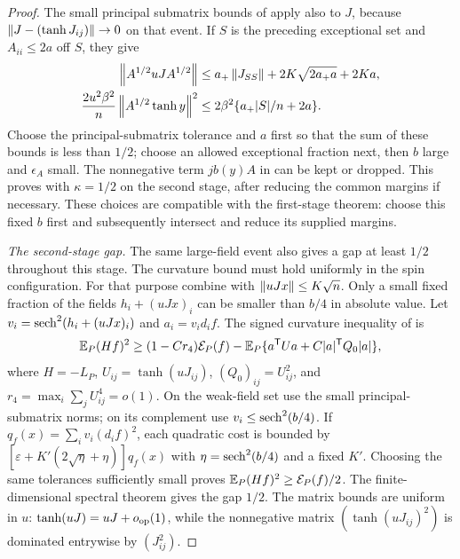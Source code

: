 \begin{proof}
The small principal submatrix bounds of \cite[Lemma~8.2]{SKGap} apply also
to $J$, because $\left\lVert J-(\tanh J_{ij})\right\rVert\to0$ on that event.  If
$S$ is the preceding exceptional set and $A_{ii}\le2a$ off $S$, they give
\begin{align*}
 \left\lVert A^{1/2}uJA^{1/2}\right\rVert
 &\le a_+\left\lVert J_{SS}\right\rVert+2K\sqrt{2a_+a}+2Ka,\\
 \frac{2u^2\beta^2}{n}\left\lVert A^{1/2}\tanh y\right\rVert^2
 &\le2\beta^2\{a_+|S|/n+2a\}.
\end{align*}
Choose the principal-submatrix tolerance and $a$ first so that the sum of
these bounds is less than $1/2$; choose an allowed exceptional fraction
next, then $b$ large and $\epsilon_A$ small.  The nonnegative term
$jb(y)A$ in  can be kept or dropped.
This proves  with $\kappa=1/2$ on the second
stage, after reducing the common margins if necessary.  These choices
are compatible with the first-stage theorem: choose this fixed $b$ first
and subsequently intersect and reduce its supplied margins.

\emph{The second-stage gap.}
The same large-field event also gives a gap at least $1/2$ throughout
this stage.  The curvature bound must hold uniformly in the spin
configuration.  For that purpose combine  with
$\left\lVert uJx\right\rVert\le K\sqrt n$.  Only a small fixed fraction of the fields
$h_i+(uJx)_i$ can be smaller than $b/4$ in absolute value.
Let $v_i=\operatorname{sech}^2(h_i+(uJx)_i)$ and $a_i=v_id_if$.
The signed curvature inequality of \cite[Lemma~8.1]{SKGap} is
\[
 \mathbb E_P(Hf)^2\ge(1-Cr_4)\mathcal E_P(f)
       -\mathbb E_P\{a^{\mathsf T}Ua+C|a|^{\mathsf T}Q_0|a|\},
\]
where $H=-L_P$, $U_{ij}=\tanh(uJ_{ij})$,
$(Q_0)_{ij}=U_{ij}^2$, and $r_4=\max_i\sum_jU_{ij}^4=o(1)$.
On the weak-field set use the small principal-submatrix norms; on its
complement use $v_i\le\operatorname{sech}^2(b/4)$.  If
$q_f(x)=\sum_i v_i(d_if)^2$, each quadratic cost is bounded by
$[\varepsilon+K'(2\sqrt\eta+\eta)]q_f(x)$ with
$\eta=\operatorname{sech}^2(b/4)$ and a fixed $K'$.  Choosing the same tolerances
sufficiently small proves
$\mathbb E_P(Hf)^2\ge\mathcal E_P(f)/2$.  The finite-dimensional spectral
theorem gives the gap $1/2$.  The matrix bounds are uniform in $u$:
$\tanh(uJ)=uJ+o_{\mathrm{op}}(1)$, while the nonnegative matrix
$(\tanh(uJ_{ij})^2)$ is dominated entrywise by $(J_{ij}^2)$.


\end{proof}

